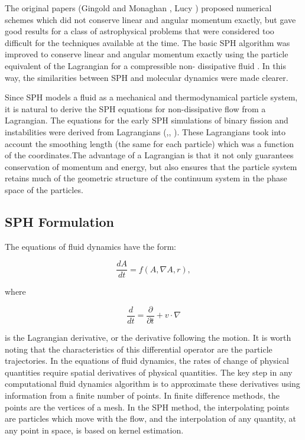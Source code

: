 The original papers (Gingold and Monaghan \cite{gingold_smoothed_1977}, Lucy \cite{lucy_numerical_1977}) proposed numerical schemes which did not conserve linear and angular momentum 
exactly, but gave good results for a class of astrophysical problems that were considered too difficult for the techniques available at the time. The basic SPH algorithm was improved 
to conserve linear and angular momentum exactly using the particle equivalent of the Lagrangian for a compressible non- dissipative fluid \cite{gingold_kernel_1982}. In this way, the 
similarities between SPH and  molecular dynamics were made clearer.\par


Since SPH models a fluid as a mechanical and thermodynamical particle system, it is natural to derive the SPH equations for non-dissipative flow from a Lagrangian. The
equations for the early SPH simulations of binary fission and instabilities were derived from Lagrangians (\cite{gingold_binary_1978},\cite{gingold_numerical_1979},
\cite{r._a._gingold_roche_1980}). These Lagrangians took into account the smoothing length (the same for each particle) which was a function of the coordinates.The advantage 
of a Lagrangian is that it not only guarantees conservation of momentum and energy, but also ensures that the particle system retains much of the geometric structure of the continuum 
system in the phase space of the particles.\par



\subsection{SPH Formulation}
\label{sec:section 1}

The equations of fluid dynamics \cite{monaghan_smoothed_2005} have the form:

\begin{equation} 
  \frac{dA}{dt} = f ( A , \nabla A , r),
\end{equation}

where

\begin{equation} 
\frac{d}{dt} = \frac{\partial}{\partial t} + v \cdot \nabla
\end{equation}

is the Lagrangian derivative, or the derivative following the motion. It is worth noting that the
characteristics of this differential operator are the particle trajectories.
In the equations of fluid dynamics, the rates of change of physical quantities require spatial
derivatives of physical quantities. The key step in any computational fluid dynamics algorithm
is to approximate these derivatives using information from a finite number of points. In finite
difference methods, the points are the vertices of a mesh. In the SPH method, the interpolating
points are particles which move with the flow, and the interpolation of any quantity, at any
point in space, is based on kernel estimation.\par

